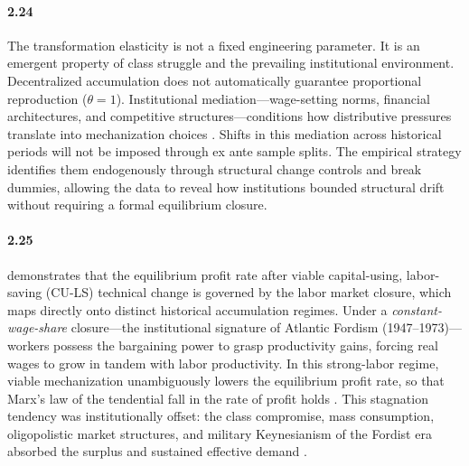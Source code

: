 \paragraph{2.24}
The transformation elasticity is not a fixed
engineering parameter. It is an emergent property of class
struggle and the prevailing institutional environment.
Decentralized accumulation does not automatically guarantee
proportional reproduction ($\theta = 1$). Institutional
mediation---wage-setting norms, financial architectures, and
competitive structures---conditions how distributive pressures
translate into mechanization choices
\citep{Aglietta2000, VidalPeck2012}. Shifts in this
mediation across historical periods will not be imposed
through ex ante sample splits. The empirical strategy
identifies them endogenously through structural change
controls and break dummies, allowing the data to reveal how
institutions bounded structural drift without requiring a
formal equilibrium closure.

\paragraph{2.25}
\citet{Basu2026} demonstrates that the equilibrium profit
rate after viable capital-using, labor-saving (CU-LS)
technical change is governed by the labor market closure,
which maps directly onto distinct historical accumulation
regimes. Under a \textit{constant-wage-share} closure---the
institutional signature of Atlantic Fordism
(1947--1973)---workers possess the bargaining power to grasp
productivity gains, forcing real wages to grow in tandem with
labor productivity. In this strong-labor regime, viable
mechanization unambiguously lowers the equilibrium profit
rate, so that Marx's law of the tendential fall in the rate
of profit holds \citep{Basu2026}. This stagnation tendency
was institutionally offset: the class compromise, mass
consumption, oligopolistic market structures, and military
Keynesianism of the Fordist era absorbed the surplus and
sustained effective demand \citep{Vidal2019}.

